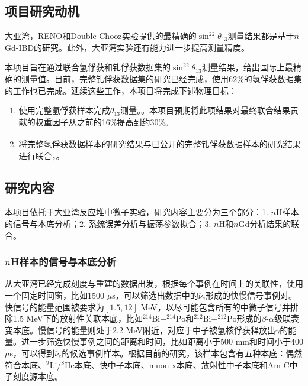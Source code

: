\documentclass[a4paper,zihao=-4]{article}
\newcommand{\citess}[1]{\textsuperscript{\cite{#1}}}
\begin{document}
\subsection{项目研究动机}
大亚湾，RENO和Double Chooz实验提供的最精确的$\sin^22\theta_{13}$测量结果都是基于$n$Gd-IBD的研究。此外，大亚湾实验还有能力进一步提高测量精度。

本项目旨在通过联合氢俘获和钆俘获数据集的$\sin^22\theta_{13}$测量结果，给出国际上最精确的测量值。目前，完整钆俘获数据集的研究已经完成，使用62\%的氢俘获数据集的工作也已完成。延续这些工作，本项目将完成下述物理目标：
\begin{enumerate}
	\item 使用完整氢俘获样本完成$\theta_{13}$测量。。本项目预期将此项结果对最终联合结果贡献的权重因子从之前的16\%提高到约30\%。
	\item 将完整氢俘获数据样本的研究结果与已公开的完整钆俘获数据样本的研究结果\citess{DayaBay:2022orm}进行联合，。
\end{enumerate}

\begin{spacing}{1.3} %
	 \songti   
	
	  
	\vspace{11bp}
\end{spacing}

\subsection{研究内容}

本项目依托于大亚湾反应堆中微子实验，研究内容主要分为三个部分：1. $n$H样本的信号与本底分析；2. 系统误差分析与振荡参数拟合；3. $n$H和$n$Gd分析结果的联合。

\subsubsection{$n$H样本的信号与本底分析}\label{sec:backgrounds}
从大亚湾已经完成刻度与重建的数据出发，根据每个事例在时间上的关联性，使用一个固定时间窗，比如1500 $\mu$s，可以筛选出数据中的$\overline{\nu}_e$形成的快慢信号事例对。快信号的能量范围被要求为$[1.5, 12]$ MeV，以尽可能包含所有的中微子信号并排除1.5 MeV下的放射性关联本底，比如$^{214}\text{Bi}-^{214}\text{Po}$和$^{212}\text{Bi}-^{212}\text{Po}$形成的$\beta$-$\alpha$级联衰变本底。慢信号的能量则处于2.2 MeV附近，对应于中子被氢核俘获释放出$\gamma$的能量。进一步筛选快慢事例之间的距离和时间，比如距离小于500 mm和时间小于400 $\mu$s，可以得到$\overline{\nu}_e$的候选事例样本。根据目前的研究，该样本包含有五种本底：偶然符合本底、$^9$Li/$^8$He本底、快中子本底、muon-x本底、放射性中子本底和Am-C中子刻度源本底。
\end{document}
